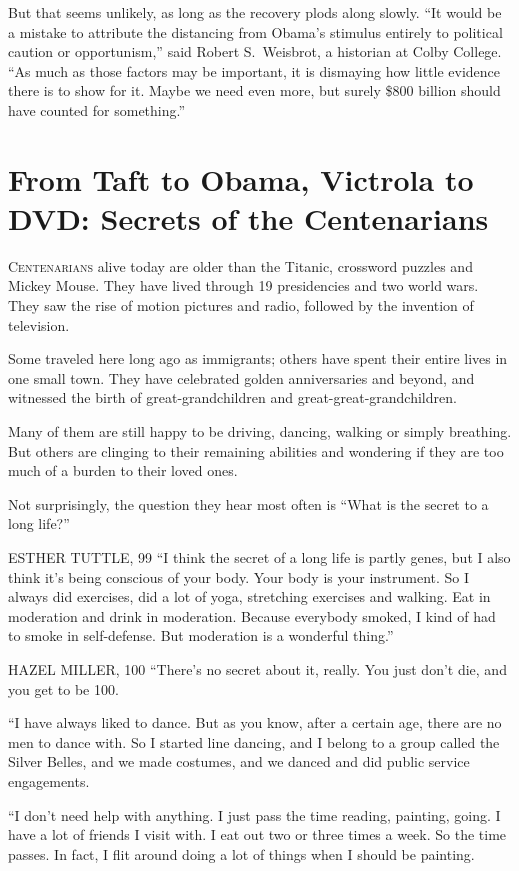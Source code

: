 ﻿\documentclass[12pt]{article}
\begin{document}
But that seems unlikely, as long as the recovery plods along slowly. ``It would be a mistake to
attribute the distancing from Obama's stimulus entirely to political caution or opportunism,'' said
Robert S.~Weisbrot, a historian at Colby College. ``As much as those factors may be important, it is
dismaying how little evidence there is to show for it. Maybe we need even more, but surely \$800
billion should have counted for something.''

\section{From Taft to Obama, Victrola to DVD: Secrets of the Centenarians}

\lettrine{C}{entenarians} alive today are older than the Titanic, crossword
puzzles and Mickey Mouse. They have lived through 19 presidencies and two world wars. They saw the
rise of motion pictures and radio, followed by the invention of television.

Some traveled here long ago as immigrants; others have spent their entire lives in one small town.
They have celebrated golden anniversaries and beyond, and witnessed the birth of great-grandchildren
and great-great-grandchildren.

Many of them are still happy to be driving, dancing, walking or simply breathing. But others are
clinging to their remaining abilities and wondering if they are too much of a burden to their loved
ones.

Not surprisingly, the question they hear most often is ``What is the secret to a long life?''

ESTHER TUTTLE, 99 ``I think the secret of a long life is partly genes, but I also think it's being
conscious of your body. Your body is your instrument. So I always did exercises, did a lot of yoga,
stretching exercises and walking. Eat in moderation and drink in moderation. Because everybody
smoked, I kind of had to smoke in self-defense. But moderation is a wonderful thing.''

HAZEL MILLER, 100 ``There's no secret about it, really. You just don't die, and you get to be 100.

``I have always liked to dance. But as you know, after a certain age, there are no men to dance
with. So I started line dancing, and I belong to a group called the Silver Belles, and we made
costumes, and we danced and did public service engagements.

``I don't need help with anything. I just pass the time reading, painting, going. I have a lot of
friends I visit with. I eat out two or three times a week. So the time passes. In fact, I flit
around doing a lot of things when I should be painting.
\end{document}
